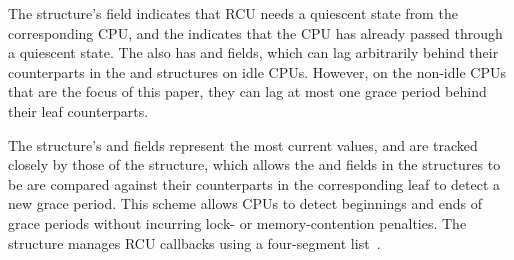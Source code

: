 The  structure's  field indicates that RCU
needs a quiescent state from the corresponding CPU, and the
 indicates that the CPU has already passed through
a quiescent state.
%
The  also has  and  fields,
which can lag arbitrarily behind their counterparts in
the  and  structures on idle CPUs.
However, on the non-idle CPUs that are the focus of this paper,
they can lag at most one grace period behind their leaf  
counterparts.

The  structure's  and  fields
represent the most current values, and are tracked closely by those of
the  structure, which allows the  and
 fields in the  structures to be
are compared against their counterparts in the corresponding leaf 
to detect a new grace period. 
This scheme allows CPUs to detect beginnings and ends of grace periods without
incurring lock- or memory-contention penalties.
%
The  structure manages RCU callbacks using a 
four-segment list~\cite{LaiJiangshan2008NewClassicAlgorithm}.



